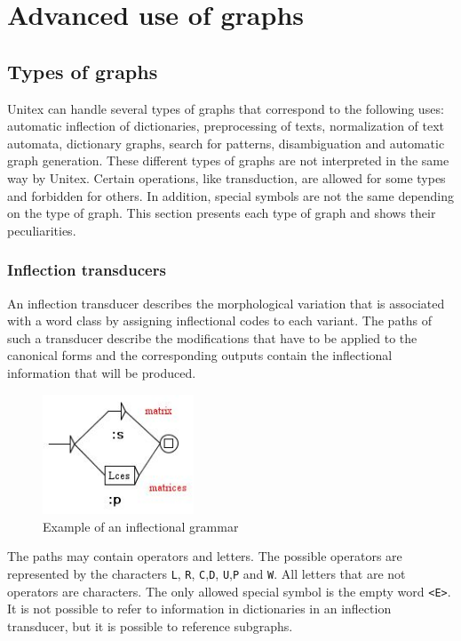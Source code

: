 \chapter{Advanced use of graphs}
\label{chap-advanced-grammars}
\section{Types of graphs}
Unitex can handle several types of graphs that correspond to the following
uses: automatic inflection of dictionaries, preprocessing of texts, normalization
of text automata, dictionary graphs, search for patterns, disambiguation and
automatic graph generation. These different types of graphs are not interpreted
in the same way by Unitex. Certain operations, like transduction, are allowed for
some types and forbidden for others. In addition, special symbols are not the
same depending on the type of graph. This section presents each type of graph
and shows their peculiarities.

\subsection{Inflection transducers}
An inflection transducer describes the morphological variation that is associated
with a word class by assigning inflectional codes to each variant. The paths of
such a transducer describe the modifications that have to be applied to the canonical
forms and the corresponding outputs contain the inflectional information that will be
produced.

\bigskip
\begin{figure}[!h]
\begin{center}
\includegraphics[width=4.5cm]{resources/img/fig6-1.png}
\caption{Example of an inflectional grammar}
\end{center}
\end{figure}

\noindent The paths may contain operators and letters. The possible operators
are represented by the characters \verb+L+, \verb+R+, \verb+C+,\verb+D+, 
\verb+U+,\verb+P+ and \verb+W+.
All letters that are not operators are characters. The only
allowed special symbol is the empty word \verb+<E>+. It is not
possible to refer to information in dictionaries in an inflection transducer,
but it is possible to reference subgraphs.

